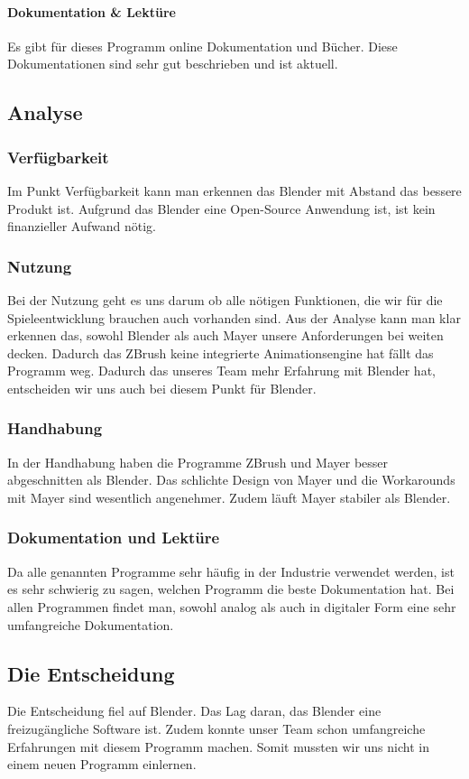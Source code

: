 \paragraph{Dokumentation \& Lektüre}
Es gibt für dieses Programm online Dokumentation und Bücher. Diese Dokumentationen sind sehr gut beschrieben und ist aktuell.

\pagebreak

\subsection{Analyse}
\subsubsection{Verfügbarkeit}
Im Punkt Verfügbarkeit kann man erkennen das Blender mit Abstand das bessere Produkt ist. Aufgrund das Blender eine Open-Source Anwendung ist, ist kein finanzieller Aufwand nötig.

\subsubsection{Nutzung}
Bei der Nutzung geht es uns darum ob alle nötigen Funktionen, die wir für die Spieleentwicklung brauchen auch vorhanden sind. Aus der Analyse kann man klar erkennen das, sowohl Blender als auch Mayer unsere Anforderungen bei weiten decken. Dadurch das ZBrush keine integrierte Animationsengine hat fällt das Programm weg. Dadurch das unseres Team mehr Erfahrung mit Blender hat, entscheiden wir uns auch bei diesem Punkt für Blender.

\subsubsection{Handhabung}
In der Handhabung haben die Programme ZBrush und Mayer besser abgeschnitten als Blender. Das schlichte Design von Mayer und die Workarounds mit Mayer sind wesentlich angenehmer. Zudem läuft Mayer stabiler als Blender.

\subsubsection{Dokumentation und Lektüre}
Da alle genannten Programme sehr häufig in der Industrie verwendet werden, ist es sehr schwierig zu sagen, welchen Programm die beste Dokumentation hat. Bei allen Programmen findet man, sowohl analog als auch in digitaler Form eine sehr umfangreiche Dokumentation.

\subsection{Die Entscheidung}
Die Entscheidung fiel auf Blender. Das Lag daran, das Blender eine freizugängliche Software ist. Zudem konnte unser Team schon umfangreiche Erfahrungen mit diesem Programm machen. Somit mussten wir uns nicht in einem neuen Programm einlernen.
